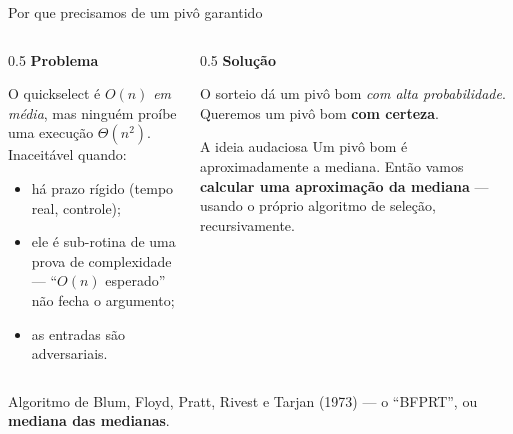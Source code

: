 \documentclass[aspectratio=169]{beamer}
\begin{document}
\begin{frame}[shrink=20]{Por que precisamos de um pivô garantido}
  \begin{columns}[T]
    \begin{column}{0.5\textwidth}
      \textbf{Problema}

      O quickselect é $O(n)$ \emph{em média}, mas ninguém proíbe uma execução
      $\Theta(n^2)$. Inaceitável quando:
      \begin{itemize}
        \item há prazo rígido (tempo real, controle);
        \item ele é sub-rotina de uma prova de complexidade --- ``$O(n)$
              esperado'' não fecha o argumento;
        \item as entradas são adversariais.
      \end{itemize}
    \end{column}
    \begin{column}{0.5\textwidth}
      \textbf{Solução}

      \medskip
      O sorteio dá um pivô bom \emph{com alta probabilidade}.
      Queremos um pivô bom \textbf{com certeza}.

      \medskip
      \begin{block}{A ideia audaciosa}
        Um pivô bom é aproximadamente a mediana. Então vamos
        \textbf{calcular uma aproximação da mediana} --- usando o próprio
        algoritmo de seleção, recursivamente.
      \end{block}
    \end{column}
  \end{columns}

  \begin{center}
    \small Algoritmo de Blum, Floyd, Pratt, Rivest e Tarjan (1973) --- o
    ``BFPRT'', ou \textbf{mediana das medianas}.
  \end{center}
\end{frame}
\end{document}
